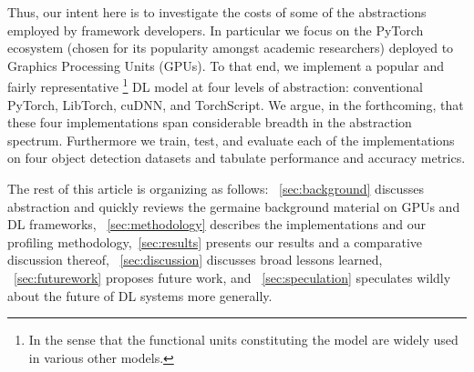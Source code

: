 Thus, our intent here is to investigate the costs of some of the abstractions employed by framework developers.
In particular we focus on the PyTorch ecosystem (chosen for its popularity amongst academic researchers) deployed to Graphics Processing Units (GPUs).
To that end, we implement a popular and fairly representative%
\footnote{In the sense that the functional units constituting the model are widely used in various other models.}
DL model at four levels of abstraction: conventional PyTorch, LibTorch, cuDNN, and TorchScript.
We argue, in the forthcoming, that these four implementations span considerable breadth in the abstraction spectrum.
Furthermore we train, test, and evaluate each of the implementations on four object detection datasets and tabulate performance and accuracy metrics.

The rest of this article is organizing as follows: ~\cref{sec:background} discusses abstraction and quickly reviews the germaine background material on GPUs and DL frameworks, ~\cref{sec:methodology} describes the implementations and our profiling methodology,~\cref{sec:results} presents our results and a comparative discussion thereof, ~\cref{sec:discussion} discusses broad lessons learned, ~\cref{sec:futurework} proposes future work, and ~\cref{sec:speculation} speculates wildly about the future of DL systems more generally.


